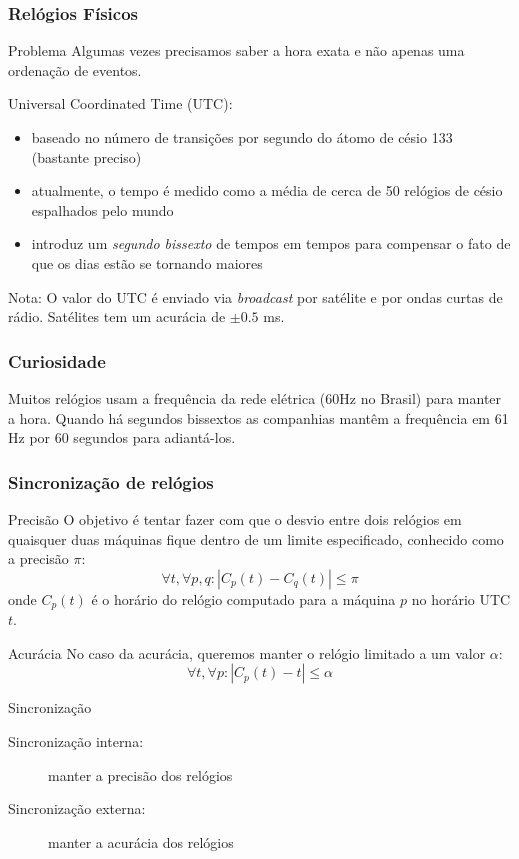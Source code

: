 \documentclass[Ligatures=TeX,table,brazil,svgnames,usetotalslideindicator,compress,10pt]{beamer}
\begin{document}
\begin{frame}
  \frametitle{Relógios Físicos}
  \begin{alertblock}{Problema}
    Algumas vezes precisamos saber a hora exata e não apenas uma ordenação de eventos.
  \end{alertblock}

  \begin{block}{Universal Coordinated Time (UTC):}
    \begin{itemize}
    \item baseado no número de transições por segundo do átomo de césio 133 (bastante preciso)
    \item atualmente, o tempo é medido como a média de cerca de 50 relógios de césio espalhados pelo mundo
    \item introduz um \emph{segundo bissexto} de tempos em tempos para compensar o fato de que os dias estão se tornando maiores
    \end{itemize}
  \end{block}
  \begin{block}{Nota:}
    O valor do UTC é enviado via \textit{broadcast} por satélite e por ondas curtas de rádio. Satélites tem um acurácia de ${\pm 0.5}$ ms.
  \end{block}
\end{frame}

\begin{frame}
  \frametitle{Curiosidade}
    Muitos relógios usam a frequência da rede elétrica (60Hz no
    Brasil) para manter a hora. Quando há segundos bissextos as
    companhias mantêm a frequência em 61 Hz por 60 segundos para
    adiantá-los.
\end{frame}

\begin{frame}
  \frametitle{Sincronização de relógios}

  \small

  \begin{block}{Precisão}
    O objetivo é tentar fazer com que o desvio \alert{entre dois relógios em quaisquer duas máquinas} fique dentro de um limite especificado, conhecido como a \alert{precisão} $\pi$:
    \[ \forall t, \forall p,q : | C_p(t) - C_q(t) | \le \pi \]
    onde $C_p(t)$ é o horário do relógio \alert{computado} para a máquina $p$ no \alert{horário UTC} $t$.
  \end{block}

  \begin{block}{Acurácia}
    No caso da \alert{acurácia}, queremos manter o relógio limitado a um valor $\alpha$:
    \[ \forall t, \forall p : | C_p(t) - t | \le \alpha  \]
  \end{block}

  \begin{block}{Sincronização}
    \begin{description}
    \item[Sincronização interna:] manter a \alert{precisão} dos relógios
    \item[Sincronização externa:] manter a \alert{acurácia} dos relógios
    \end{description}
  \end{block}
\end{frame}
\end{document}
